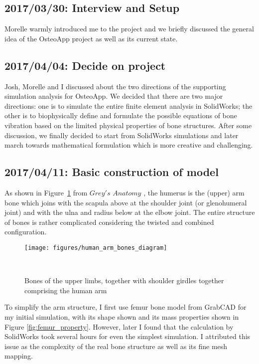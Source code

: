 \documentclass{sigchi}
\begin{document}
\subsection{2017/03/30: Interview and Setup}

Morelle warmly introduced me to the project and we briefly discussed the general idea of the OsteoApp project as well as its current state. 

\subsection{2017/04/04: Decide on project}

Josh, Morelle and I discussed about the two directions of the supporting simulation analysis for OsteoApp. We decided that there are two major directions: one is to simulate the entire finite element analysis in SolidWorks; the other is to biophysically define and formulate the possible equations of bone vibration based on the limited physical properties of bone structures. 
After some discussion, we finally decided to start from SolidWorks simulations and later march towards mathematical formulation which is more creative and challenging.

\subsection{2017/04/11: Basic construction of model}

As shown in Figure~\ref{fig:arm_diagram} from $Grey's$ $Anatomy$ \cite{WikipediaEN:Arm}, the humerus is the (upper) arm bone which joins with the scapula above at the shoulder joint (or glenohumeral joint) and with the ulna and radius below at the elbow joint. The entire structure of bones is rather complicated considering the twisted and combined configuration.


\begin{figure}
\centering
  \texttt{[image: figures/human\_arm\_bones\_diagram]}
  \caption{Bones of the upper limbs, together with shoulder girdles together comprising the human arm}~\label{fig:arm_diagram}
\end{figure}


To simplify the arm structure, I first use femur bone model from GrabCAD \cite{SB:bone} for my initial simulation, with its shape shown and its mass properties shown in Figure \ref{fig:femur_property}. However, later I found that the calculation by SolidWorks took several hours for even the simplest simulation. I attributed this issue as the complexity of the real bone structure as well as its fine mesh mapping. 
\end{document}

